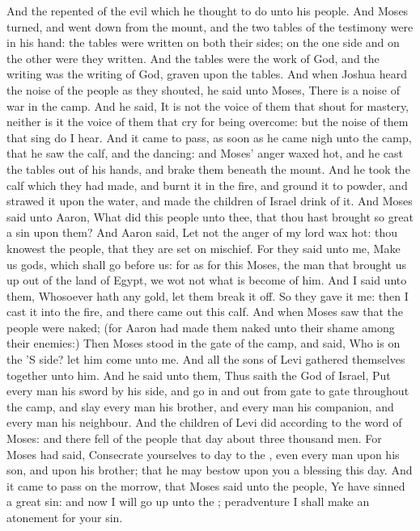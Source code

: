 \begin{biblechapter}
\verse And the \LORD repented of the evil which he thought to do unto his people.
\verse And Moses turned, and went down from the mount, and the two tables of the testimony were in his hand: the tables were written on both their sides; on the one side and on the other were they written.
\verse And the tables were the work of God, and the writing was the writing of God, graven upon the tables.
\verse And when Joshua heard the noise of the people as they shouted, he said unto Moses, There is a noise of war in the camp.
\verse And he said, It is not the voice of them that shout for mastery, neither is it the voice of them that cry for being overcome: but the noise of them that sing do I hear.
\verse And it came to pass, as soon as he came nigh unto the camp, that he saw the calf, and the dancing: and Moses' anger waxed hot, and he cast the tables out of his hands, and brake them beneath the mount.
\verse And he took the calf which they had made, and burnt it in the fire, and ground it to powder, and strawed it upon the water, and made the children of Israel drink of it.
\verse And Moses said unto Aaron, What did this people unto thee, that thou hast brought so great a sin upon them?
\verse And Aaron said, Let not the anger of my lord wax hot: thou knowest the people, that they are set on mischief.
\verse For they said unto me, Make us gods, which shall go before us: for as for this Moses, the man that brought us up out of the land of Egypt, we wot not what is become of him.
\verse And I said unto them, Whosoever hath any gold, let them break it off. So they gave it me: then I cast it into the fire, and there came out this calf.
\verse And when Moses saw that the people were naked; (for Aaron had made them naked unto their shame among their enemies:)
\verse Then Moses stood in the gate of the camp, and said, Who is on the \LORD'S side? let him come unto me. And all the sons of Levi gathered themselves together unto him.
\verse And he said unto them, Thus saith the \LORD God of Israel, Put every man his sword by his side, and go in and out from gate to gate throughout the camp, and slay every man his brother, and every man his companion, and every man his neighbour.
\verse And the children of Levi did according to the word of Moses: and there fell of the people that day about three thousand men.
\verse For Moses had said, Consecrate yourselves to day to the \LORD, even every man upon his son, and upon his brother; that he may bestow upon you a blessing this day.
\verse And it came to pass on the morrow, that Moses said unto the people, Ye have sinned a great sin: and now I will go up unto the \LORD; peradventure I shall make an atonement for your sin.

\end{biblechapter}
